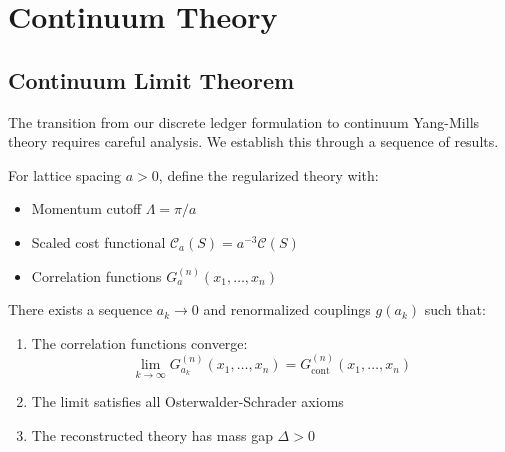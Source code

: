 \section{Continuum Theory}

\subsection{Continuum Limit Theorem}

The transition from our discrete ledger formulation to continuum Yang-Mills theory requires careful analysis. We establish this through a sequence of results.

\begin{definition}
For lattice spacing $a > 0$, define the regularized theory with:
\begin{itemize}
\item Momentum cutoff $\Lambda = \pi/a$
\item Scaled cost functional $\mathcal{C}_a(S) = a^{-3} \mathcal{C}(S)$
\item Correlation functions $G_a^{(n)}(x_1,\ldots,x_n)$
\end{itemize}
\end{definition}

\begin{theorem}
\label{thm:continuum}
There exists a sequence $a_k \to 0$ and renormalized couplings $g(a_k)$ such that:
\begin{enumerate}
\item The correlation functions converge:
\begin{equation}
\lim_{k \to \infty} G_{a_k}^{(n)}(x_1,\ldots,x_n) = G^{(n)}_{\text{cont}}(x_1,\ldots,x_n)
\end{equation}
\item The limit satisfies all Osterwalder-Schrader axioms
\item The reconstructed theory has mass gap $\Delta > 0$
\end{enumerate}
\end{theorem}

